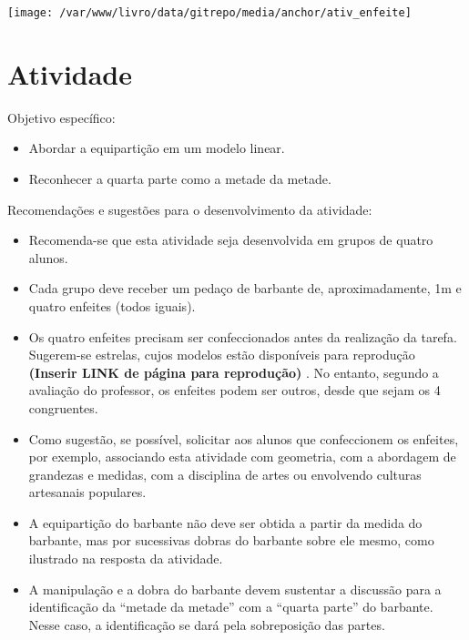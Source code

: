 \documentclass[a4paper,12pt,twoside]{book}
\begin{document}
\texttt{[image: /var/www/livro/data/gitrepo/media/anchor/ativ\_enfeite]}
\section{Atividade}




\begin{professor*}[breakable]{}{}  
  Objetivo específico:  
\begin{itemize} %
    \item       Abordar a equipartição em um modelo linear.
    \item       Reconhecer a quarta parte como a metade da metade.
\end{itemize} %
  
  
  Recomendações e sugestões para o desenvolvimento da atividade:  
  
\begin{itemize} %
    \item       Recomenda-se que esta atividade seja desenvolvida em grupos de quatro alunos. 
    \item       Cada grupo deve receber um pedaço de barbante de, aproximadamente, 1m e quatro enfeites (todos iguais).  
    \item       Os quatro enfeites precisam ser confeccionados antes da realização da tarefa. Sugerem-se estrelas, cujos modelos estão disponíveis para reprodução       {\bf (Inserir LINK de página para reprodução)}      . No entanto, segundo a avaliação do professor, os enfeites podem ser outros, desde que sejam os 4 congruentes.
    \item       Como sugestão, se possível, solicitar aos alunos que confeccionem os enfeites, por exemplo, associando esta atividade com geometria, com a abordagem de grandezas e medidas, com a disciplina de artes ou envolvendo culturas artesanais populares.
    \item       A equipartição do barbante não deve ser obtida a partir da medida do barbante, mas por sucessivas dobras do barbante sobre ele mesmo, como ilustrado na resposta da atividade.
    \item       A manipulação e a dobra do barbante devem sustentar a discussão para a identificação da       ``metade da metade''       com a       ``quarta parte''       do barbante. Nesse caso, a identificação se dará pela sobreposição das partes. 
\end{itemize} %
  
\end{professor*}
\end{document}
